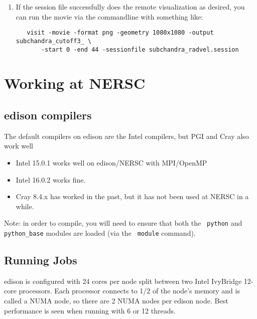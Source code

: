\begin{itemize}
\begin{enumerate}
  \item If the session file successfully does the remote visualization
   as desired, you can run the movie via the commandline with something like:

   \begin{verbatim}
   visit -movie -format png -geometry 1080x1080 -output subchandra_cutoff3_ \
       -start 0 -end 44 -sessionfile subchandra_radvel.session
   \end{verbatim}

  \end{enumerate}

\end{itemize}


\section{Working at NERSC}

\subsection{edison compilers}

The default compilers on edison are the Intel compilers, but
PGI and Cray also work well

\begin{itemize}
\item Intel 15.0.1 works well on edison/NERSC with MPI/OpenMP

\item Intel 16.0.2 works fine.

\item Cray 8.4.x has worked in the past, but it has not been used
  at NERSC in a while.

\end{itemize}

Note: in order to compile, you will need to ensure that both the {\tt
python} and {\tt python\_base} modules are loaded (via the {\tt
module} command).  

\subsection{Running Jobs}

edison is configured with 24 cores per node split between two Intel
IvyBridge 12-core processors.  Each processor connects to 1/2 of the
node's memory and is called a NUMA node, so there are 2 NUMA nodes per
edison node.  Best performance is seen when running with 6 or 12 threads.

